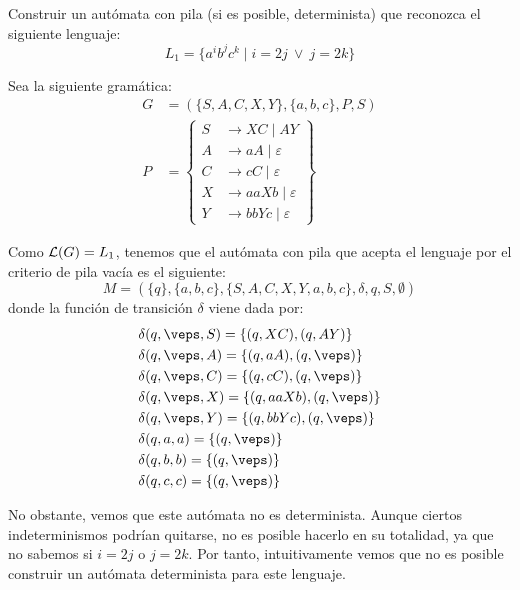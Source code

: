 \begin{ejercicio}\label{ej:1.5.25}
    Construir un autómata con pila (si es posible, determinista) que reconozca el siguiente lenguaje:
    \begin{equation*}
        L_1 = \{a^i b^j c^k \mid i = 2j\ \lor\ j = 2k\}
    \end{equation*}

    Sea la siguiente gramática:
    \begin{align*}
        G&=(\{S,A,C,X,Y\},\{a,b,c\},P,S)\\
        P&=\left\{
            \begin{aligned}
                S&\to XC \mid AY\\
                A&\to aA \mid \varepsilon\\
                C&\to cC \mid \varepsilon\\
                X&\to aaXb \mid \varepsilon\\
                Y&\to bbYc \mid \varepsilon
            \end{aligned}
        \right\}
    \end{align*}

    Como $\mathcal{L}(G)=L_1$, tenemos que el autómata con pila que acepta el lenguaje por el criterio de pila vacía es el siguiente:
    \begin{equation*}
        M=(\{q\},\{a,b,c\},\{S,A,C,X,Y,a,b,c\},\delta,q,S,\emptyset)
    \end{equation*}
    donde la función de transición $\delta$ viene dada por:
    \begin{align*}
        &\delta(q,\veps,S) = \{(q,XC),(q,AY)\}\\
        &\delta(q,\veps,A) = \{(q,aA),(q,\veps)\}\\
        &\delta(q,\veps,C) = \{(q,cC),(q,\veps)\}\\
        &\delta(q,\veps,X) = \{(q,aaXb),(q,\veps)\}\\
        &\delta(q,\veps,Y) = \{(q,bbYc),(q,\veps)\}\\
        &\delta(q,a,a) = \{(q,\veps)\}\\
        &\delta(q,b,b) = \{(q,\veps)\}\\
        &\delta(q,c,c) = \{(q,\veps)\}
    \end{align*}

    No obstante, vemos que este autómata no es determinista. Aunque ciertos indeterminismos podrían quitarse, no es posible hacerlo en su totalidad, ya que no sabemos si $i=2j$ o $j=2k$. Por tanto, intuitivamente vemos que no es posible construir un autómata determinista para este lenguaje.

\end{ejercicio}

